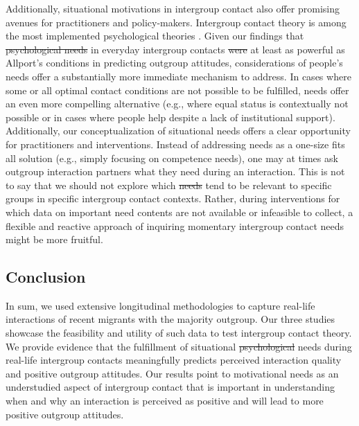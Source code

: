 \documentclass[man, 12pt, a4paper, mask]{apa7}
\theoremstyle{break}
\theoremstyle{plain}
\providecommand{\DIFaddtex}[1]{{\protect\color{blue}\uwave{#1}}} %
\providecommand{\DIFdeltex}[1]{{\protect\color{red}\sout{#1}}}                      %
\providecommand{\DIFaddbegin}{} %
\providecommand{\DIFaddend}{} %
\providecommand{\DIFdelbegin}{} %
\providecommand{\DIFdelend}{} %
\providecommand{\DIFadd}[1]{\texorpdfstring{\DIFaddtex{#1}}{#1}} %
\providecommand{\DIFdel}[1]{\texorpdfstring{\DIFdeltex{#1}}{}} %
\newcommand{\DIFscaledelfig}{0.5}
\newlength{\DIFdelgraphicswidth} %
\newlength{\DIFdelgraphicsheight} %
\newcommand{\DIFaddincludegraphics}[2][]{{\color{blue}\fbox{\DIFOincludegraphics[#1]{#2}}}} %
\newcommand{\DIFdelincludegraphics}[2][]{%
\sbox{\DIFdelgraphicsbox}{\DIFOincludegraphics[#1]{#2}}%
\settoboxwidth{\DIFdelgraphicswidth}{\DIFdelgraphicsbox} %
\settoboxtotalheight{\DIFdelgraphicsheight}{\DIFdelgraphicsbox} %
\scalebox{\DIFscaledelfig}{%
\parbox[b]{\DIFdelgraphicswidth}{\usebox{\DIFdelgraphicsbox}\\[-\baselineskip] \rule{\DIFdelgraphicswidth}{0em}}\llap{\resizebox{\DIFdelgraphicswidth}{\DIFdelgraphicsheight}{%
\setlength{\unitlength}{\DIFdelgraphicswidth}%
\begin{picture}(1,1)%
\thicklines\linethickness{2pt} %
{\color[rgb]{1,0,0}\put(0,0){\framebox(1,1){}}}%
{\color[rgb]{1,0,0}\put(0,0){\line( 1,1){1}}}%
{\color[rgb]{1,0,0}\put(0,1){\line(1,-1){1}}}%
\end{picture}%
}\hspace*{3pt}}} %
} %
\DeclareRobustCommand{\DIFaddbegin}{\DIFOaddbegin \let\includegraphics\DIFaddincludegraphics} %
\DeclareRobustCommand{\DIFaddend}{\DIFOaddend \let\includegraphics\DIFOincludegraphics} %
\DeclareRobustCommand{\DIFdelbegin}{\DIFOdelbegin \let\includegraphics\DIFdelincludegraphics} %
\DeclareRobustCommand{\DIFdelend}{\DIFOaddend \let\includegraphics\DIFOincludegraphics} %
\begin{document}
Additionally, situational motivations in intergroup contact also offer promising avenues for practitioners and policy-makers. Intergroup contact theory is among the most implemented psychological theories \citep[e.g.,][]{Pettigrew2006, AlRamiah2012a, Reimer2021}. Given our findings that \DIFdelbegin \DIFdel{psychological needs }\DIFdelend \DIFaddbegin \DIFadd{need fulfillment }\DIFaddend in everyday intergroup contacts \DIFdelbegin \DIFdel{were }\DIFdelend \DIFaddbegin \DIFadd{was }\DIFaddend at least as powerful as Allport's conditions in predicting outgroup attitudes, considerations of people's needs offer a substantially more immediate mechanism to address. In cases where some or all optimal contact conditions are not possible to be fulfilled, needs offer an even more compelling alternative (e.g., where equal status is contextually not possible or in cases where people help despite a lack of institutional support). Additionally, our conceptualization of situational needs offers a clear opportunity for practitioners and interventions. Instead of addressing needs as a one-size fits all solution (e.g., simply focusing on competence needs), one may at times ask outgroup interaction partners what they need during an interaction. This is not to say that we should not explore which \DIFdelbegin \DIFdel{needs }\DIFdelend \DIFaddbegin \DIFadd{motives }\DIFaddend tend to be relevant to specific groups in specific intergroup contact contexts. Rather, during interventions for which data on important need contents are not available or infeasible to collect, a flexible and reactive approach of inquiring momentary intergroup contact needs might be more fruitful.


\subsection{Conclusion}
In sum, we used extensive longitudinal methodologies to capture real-life interactions of recent migrants with the majority outgroup. Our three studies showcase the feasibility and utility of such data to test intergroup contact theory. We provide evidence that the fulfillment of situational \DIFdelbegin \DIFdel{psychological }\DIFdelend needs during real-life intergroup contacts meaningfully predicts perceived interaction quality and positive outgroup attitudes. Our results point to motivational needs as an understudied aspect of intergroup contact that is important in understanding when and why an interaction is perceived as positive and will lead to more positive outgroup attitudes.
\end{document}
